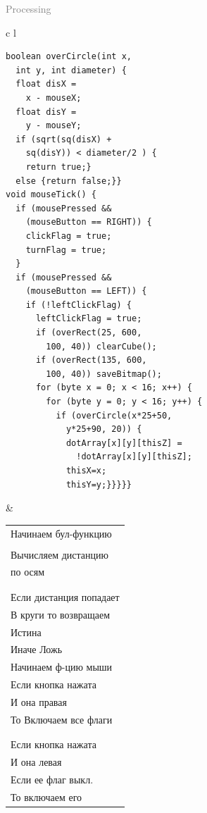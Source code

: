 \documentclass[a4paper, 12pt]{article}
\begin{document}
\begin{flushright}\begin{huge}\textcolor{grey}{Processing}\end{huge}\end{flushright}
\begin{tabular}{c l}
  \hline
  \begin{lstlisting}[style=pmyLatexStyle]
boolean overCircle(int x, 
  int y, int diameter) {
  float disX = 
    x - mouseX;
  float disY = 
    y - mouseY;
  if (sqrt(sq(disX) + 
    sq(disY)) < diameter/2 ) {
    return true;} 
  else {return false;}}
void mouseTick() {
  if (mousePressed && 
    (mouseButton == RIGHT)) {
    clickFlag = true;
    turnFlag = true;
  }
  if (mousePressed && 
    (mouseButton == LEFT)) {
    if (!leftClickFlag) {
      leftClickFlag = true;
      if (overRect(25, 600,
        100, 40)) clearCube();
      if (overRect(135, 600,
        100, 40)) saveBitmap();
      for (byte x = 0; x < 16; x++) {
        for (byte y = 0; y < 16; y++) {
          if (overCircle(x*25+50,
            y*25+90, 20)) {
            dotArray[x][y][thisZ] = 
              !dotArray[x][y][thisZ];
            thisX=x;
            thisY=y;}}}}}
\end{lstlisting}
   &
  \begin{tabular}{l}
    Начинаем бул-функцию     \\
    \\
    Вычисляем дистанцию      \\
    по осям                  \\
    \\
    \\
    Если дистанция попадает  \\
    В круги то возвращаем    \\
    Истина                   \\
    Иначе Ложь               \\
    Начинаем ф-цию мыши      \\
    Если кнопка нажата       \\
    И она правая             \\
    То Включаем все флаги    \\
    \\
    \\
    Если кнопка нажата       \\
    И она левая              \\
    Если ее флаг выкл.       \\
    То включаем его          \\

\end{tabular}
\end{tabular}
\end{document}
